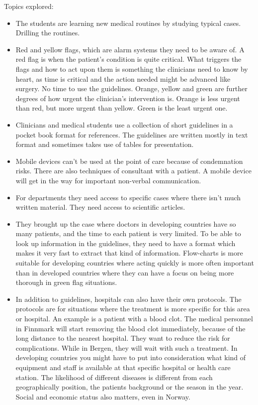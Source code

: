 Topics explored:
\begin{itemize}
	\item The students are learning new medical routines by studying typical cases. Drilling the routines.
	\item Red and yellow flags, which are alarm systems they need to be aware of. A red flag is when the patient's condition is quite critical. What triggers the flags and how to act upon them is something the clinicians need to know by heart, as time is critical and the action needed might be advanced like surgery. No time to use the guidelines. Orange, yellow and green are further degrees of how urgent the clinician's intervention is.  Orange is less urgent than red, but more urgent than yellow. Green is the least urgent one.
	\item Clinicians and medical students use a collection of short guidelines in a pocket book format for references. The guidelines are written mostly in text format and sometimes takes use of tables for presentation.
	\item Mobile devices can't be used at the point of care because of condemnation risks. There are also techniques of consultant with a patient. A mobile device will get in the way for important non-verbal communication.
	\item For departments they need access to specific cases where there isn't much written material. They need access to scientific articles.
	\item They brought up the case where doctors in developing countries have so many patients, and the time to each patient is very limited. To be able to look up information in the guidelines, they need to have a format which makes it very fast to extract that kind of information. Flow-charts is more suitable for developing countries where acting quickly is more often important than in developed countries where they can have a focus on being more thorough in green flag situations.
	\item In addition to guidelines, hospitals can also have their own protocols. The protocols are for situations where the treatment is more specific for this area or hospital. An example is a patient with a blood clot. The medical personnel in Finnmark will start removing the blood clot immediately, because of the long distance to the nearest hospital. They want to reduce the risk for complications. While in Bergen, they will wait with such a treatment. In developing countries you might have to put into consideration what kind of equipment and staff is available at that specific hospital or health care station. The likelihood of different diseases is different from each geographically position, the patients background or the season in the year. Social and economic status also matters, even in Norway.

\end{itemize}
